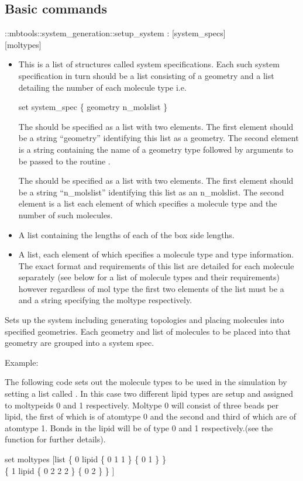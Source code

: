 \subsection{Basic commands}
\begin{code}
  ::mbtools::system_generation::setup_system  :  [system_specs]\\ 
             [iboxl] [moltypes]
\end{code}
\begin{itemize}
\item {} This is a list of structures called
  system specifications. Each such system specification in turn should
  be a list consisting of a geometry and a list detailing the number
  of each molecule type i.e.
\begin{code}
  set system\_spec \{ geometry n\_molslist \}
\end{code}
The  should be specified as a list with two
elements. The first element should be a string ``geometry''
identifying this list as a geometry. The second element is a string
containing the name of a geometry type  followed by
arguments to be passed to the routine .
  
The  should be specified as a list with two
elements. The first element should be a string ``n_molslist''
identifying this list as an n_molslist. The second element is a list
each element of which specifies a molecule type and the number of such
molecules.
\item {} A list containing the lengths of each of the box side
  lengths.
\item {} A list, each element of which specifies a
  molecule type and type information. The exact format and
  requirements of this list are detailed for each molecule separately
  (see below for a list of molecule types and their requirements)
  however regardless of mol type the first two elements of the list
  must be a  and a string specifying the moltype
  respectively.
\end{itemize}   

Sets up the system including generating topologies and placing
molecules into specified geometries. Each geometry and list of
molecules to be placed into that geometry are grouped into a system
spec.

Example:

The following code sets out the molecule types to be used in the
simulation by setting a list called . In this case two
different lipid types are setup and assigned to moltypeids 0 and 1
respectively. Moltype 0 will consist of three beads per lipid, the
first of which is of atomtype 0 and the second and third of which are
of atomtype 1. Bonds in the lipid will be of type 0 and 1
respectively.(see the
 function
for further details).
\begin{code}      	   
  set moltypes [list \{ 0 lipid \{ 0 1 1 \} \{ 0 1 \} \} \\
                     \{ 1 lipid \{ 0 2 2 2 \} \{ 0 2 \} \} ]
\end{code}
      	     	
